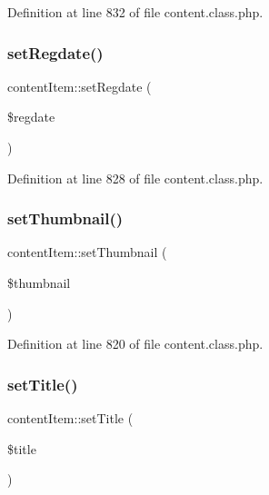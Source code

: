 Definition at line 832 of file content.\+class.\+php.

\hypertarget{classcontentItem_abb2dad632dd405213708d5c211518c82}{}\label{classcontentItem_abb2dad632dd405213708d5c211518c82} 
\subsubsection{\texorpdfstring{set\+Regdate()}{setRegdate()}}
{\footnotesize\ttfamily content\+Item\+::set\+Regdate (\begin{DoxyParamCaption}\item[{}]{\$regdate }\end{DoxyParamCaption})}



Definition at line 828 of file content.\+class.\+php.

\hypertarget{classcontentItem_a0145a758535658fa776871bfd675be15}{}\label{classcontentItem_a0145a758535658fa776871bfd675be15} 
\subsubsection{\texorpdfstring{set\+Thumbnail()}{setThumbnail()}}
{\footnotesize\ttfamily content\+Item\+::set\+Thumbnail (\begin{DoxyParamCaption}\item[{}]{\$thumbnail }\end{DoxyParamCaption})}



Definition at line 820 of file content.\+class.\+php.

\hypertarget{classcontentItem_a5a29426d7878c413cd6d63e930ce0a0f}{}\label{classcontentItem_a5a29426d7878c413cd6d63e930ce0a0f} 
\subsubsection{\texorpdfstring{set\+Title()}{setTitle()}}
{\footnotesize\ttfamily content\+Item\+::set\+Title (\begin{DoxyParamCaption}\item[{}]{\$title }\end{DoxyParamCaption})}



